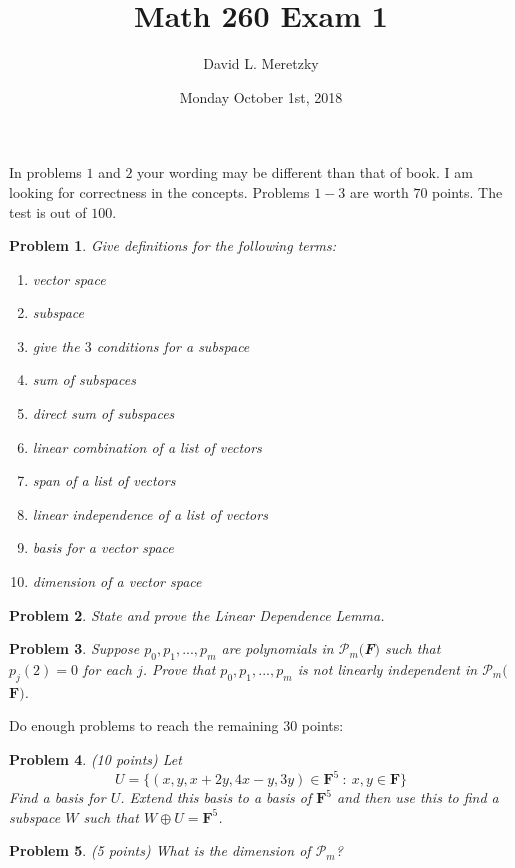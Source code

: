 \documentclass{article}
\title{ \vspace{-10ex} %
Math 260 Exam 1
}
\author{David L. Meretzky
}
\date{%
Monday October 1st, 2018
}
\theoremstyle{problemstyle}
\newtheorem{problem}{Problem}
\theoremstyle{problemstyle}
\theoremstyle{problemstyle}
\begin{document}
\maketitle

In problems $1$ and $2$ your wording may be different than that of book. I am looking for correctness in the concepts. Problems $1-3$ are worth $70$ points.  The test is out of $100$. 

\begin{problem}
Give definitions for the following terms:
\begin{enumerate}
\item vector space 
\item subspace 
\item give the $3$ conditions for a subspace
\item sum of subspaces
\item direct sum of subspaces
\item linear combination of a list of vectors
\item span of a list of vectors
\item linear independence of a list of vectors
\item basis for a vector space 
\item dimension of a vector space
\end{enumerate}
\end{problem}

\begin{problem}
State and prove the Linear Dependence Lemma.
\end{problem}

\begin{problem}
Suppose $p_0, p_1,..., p_m$ are polynomials in $\mathcal{P}_m$$($\textbf{F}$)$ such that $p_j(2) = 0$ for each $j$. Prove that $p_0, p_1,..., p_m$ is not linearly independent in $\mathcal{P}_m$$($$\textbf{F}$$)$.
\end{problem}

Do enough problems to reach the remaining $30$ points:

\begin{problem}
(10 points) Let $$U = \{(x,y,x+2y, 4x-y, 3y) \in \textbf{F}^5 \ : \ x,y \in \textbf{F}\}$$ Find a basis for $U$. Extend this basis to a basis of $\textbf{F}^5$ and then use this to find a subspace $W$ such that $W \oplus U = \textbf{F}^5$.  
\end{problem}

\begin{problem}
(5 points) What is the dimension of $\mathcal{P}_m$?
\end{problem}
\end{document}
